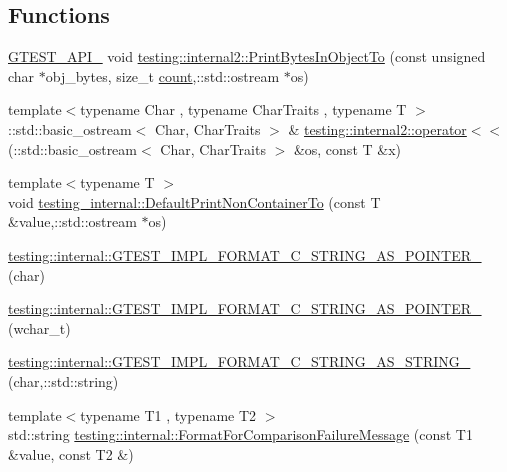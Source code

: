 \subsection*{Functions}
\begin{DoxyCompactItemize}
\item 
\hyperlink{gtest-port_8h_aa73be6f0ba4a7456180a94904ce17790}{G\+T\+E\+S\+T\+\_\+\+A\+P\+I\+\_\+} void \hyperlink{namespacetesting_1_1internal2_a04a384ee5de3a9f4f00a6052ea79b495}{testing\+::internal2\+::\+Print\+Bytes\+In\+Object\+To} (const unsigned char $\ast$obj\+\_\+bytes, size\+\_\+t \hyperlink{gmock__stress__test_8cc_afd9db40e3361ae09188795e8cbe19752}{count},\+::std\+::ostream $\ast$os)
\item 
{\footnotesize template$<$typename Char , typename Char\+Traits , typename T $>$ }\\\+::std\+::basic\+\_\+ostream$<$ Char, Char\+Traits $>$ \& \hyperlink{namespacetesting_1_1internal2_a07dbe129beb8952074f04b599dfce39b}{testing\+::internal2\+::operator$<$$<$} (\+::std\+::basic\+\_\+ostream$<$ Char, Char\+Traits $>$ \&os, const T \&x)
\item 
{\footnotesize template$<$typename T $>$ }\\void \hyperlink{namespacetesting__internal_ad4e5852805f397248a0867c0c4265ea5}{testing\+\_\+internal\+::\+Default\+Print\+Non\+Container\+To} (const T \&value,\+::std\+::ostream $\ast$os)
\item 
\hyperlink{namespacetesting_1_1internal_a3682f962ae0ec1c0eca6444ca0a09e91}{testing\+::internal\+::\+G\+T\+E\+S\+T\+\_\+\+I\+M\+P\+L\+\_\+\+F\+O\+R\+M\+A\+T\+\_\+\+C\+\_\+\+S\+T\+R\+I\+N\+G\+\_\+\+A\+S\+\_\+\+P\+O\+I\+N\+T\+E\+R\+\_\+} (char)
\item 
\hyperlink{namespacetesting_1_1internal_a85e08f00d443221e529a0a85a90fbaeb}{testing\+::internal\+::\+G\+T\+E\+S\+T\+\_\+\+I\+M\+P\+L\+\_\+\+F\+O\+R\+M\+A\+T\+\_\+\+C\+\_\+\+S\+T\+R\+I\+N\+G\+\_\+\+A\+S\+\_\+\+P\+O\+I\+N\+T\+E\+R\+\_\+} (wchar\+\_\+t)
\item 
\hyperlink{namespacetesting_1_1internal_a9dceb71a64d780beb2db1ed5bf24ad3f}{testing\+::internal\+::\+G\+T\+E\+S\+T\+\_\+\+I\+M\+P\+L\+\_\+\+F\+O\+R\+M\+A\+T\+\_\+\+C\+\_\+\+S\+T\+R\+I\+N\+G\+\_\+\+A\+S\+\_\+\+S\+T\+R\+I\+N\+G\+\_\+} (char,\+::std\+::string)
\item 
{\footnotesize template$<$typename T1 , typename T2 $>$ }\\std\+::string \hyperlink{namespacetesting_1_1internal_a91ab078f10adc669f09b7f604975c518}{testing\+::internal\+::\+Format\+For\+Comparison\+Failure\+Message} (const T1 \&value, const T2 \&)

\end{DoxyCompactItemize}
